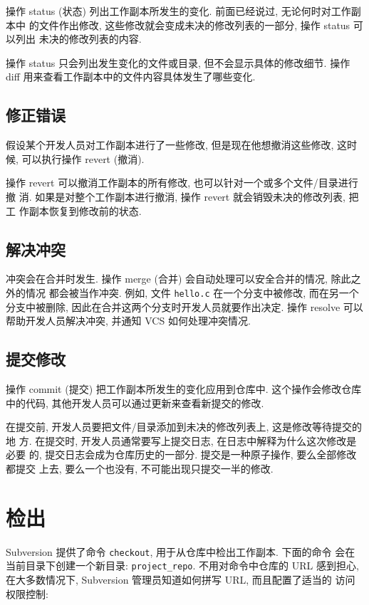 \documentclass[nofonts, oneside]{ctexart}
\newcommand\svn{\texttt{svn}}
\newcommand\svnco{\texttt{checkout}}
\begin{document}
操作 status (状态) 列出工作副本所发生的变化. 前面已经说过, 无论何时对工作副本中
的文件作出修改, 这些修改就会变成未决的修改列表的一部分, 操作 status 可以列出
未决的修改列表的内容.

操作 status 只会列出发生变化的文件或目录, 但不会显示具体的修改细节. 操作
diff 用来查看工作副本中的文件内容具体发生了哪些变化.

\subsection{修正错误}
\label{subsec:fix_mistakes}

假设某个开发人员对工作副本进行了一些修改, 但是现在他想撤消这些修改, 这时候,
可以执行操作 revert (撤消).

操作 revert 可以撤消工作副本的所有修改, 也可以针对一个或多个文件/目录进行撤
消. 如果是对整个工作副本进行撤消, 操作 revert 就会销毁未决的修改列表, 把工
作副本恢复到修改前的状态.

\subsection{解决冲突}

冲突会在合并时发生. 操作 merge (合并) 会自动处理可以安全合并的情况, 除此之外的情况
都会被当作冲突. 例如, 文件 \texttt{hello.c} 在一个分支中被修改, 而在另一个
分支中被删除, 因此在合并这两个分支时开发人员就要作出决定. 操作 resolve 可以
帮助开发人员解决冲突, 并通知 VCS 如何处理冲突情况.

\subsection{提交修改}
\label{subsec:commit_changes}

操作 commit (提交) 把工作副本所发生的变化应用到仓库中. 这个操作会修改仓库中的代码,
其他开发人员可以通过更新来查看新提交的修改.

在提交前, 开发人员要把文件/目录添加到未决的修改列表上, 这是修改等待提交的地
方. 在提交时, 开发人员通常要写上提交日志, 在日志中解释为什么这次修改是必要
的, 提交日志会成为仓库历史的一部分. 提交是一种原子操作, 要么全部修改都提交
上去, 要么一个也没有, 不可能出现只提交一半的修改.

\section{检出}
\label{sec:checkout_process}

Subversion 提供了命令 \texttt{checkout}, 用于从仓库中检出工作副本. 下面的命令
会在当前目录下创建一个新目录: \texttt{project\_repo}. 不用对命令中仓库的 URL
感到担心, 在大多数情况下, Subversion 管理员知道如何拼写 URL, 而且配置了适当的
访问权限控制:
\end{document}
